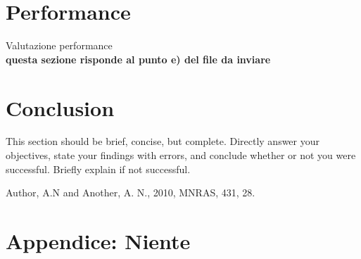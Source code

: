 \documentclass[letterpaper,11pt]{article}
\begin{document}
\section{Performance}
Valutazione performance\\
\textbf{questa sezione risponde al punto e) del file da inviare}

\section{Conclusion}
This section should be brief, concise, but complete. Directly answer your objectives, state your findings with errors, and conclude whether or not you were successful. Briefly explain if not successful.

\begin{thebibliography}{99}

Author, A.N and Another, A. N., 2010, MNRAS, 431, 28.

\end{thebibliography}

\appendix

\section*{Appendice: Niente}
\end{document}
